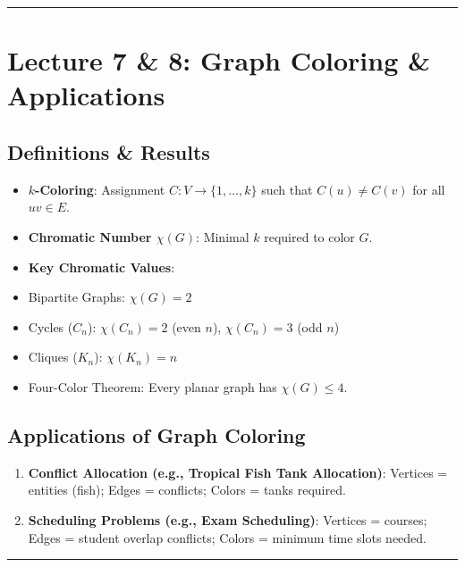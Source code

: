 \documentclass[
]{book}
\theoremstyle{definition}
\theoremstyle{definition}
\theoremstyle{definition}
\theoremstyle{definition}
\theoremstyle{remark}
\begin{document}
\begin{center}\rule{0.5\linewidth}{0.5pt}\end{center}

\section{Lecture 7 \& 8: Graph Coloring \& Applications}\label{lecture-7-8-graph-coloring-applications}

\subsection{Definitions \& Results}\label{definitions-results}

\begin{itemize}
\item
  \textbf{\(k\)-Coloring}: Assignment \(C: V \to \{1, \dots, k\}\) such that \(C(u) \ne C(v)\) for all \(uv \in E\).
\item
  \textbf{Chromatic Number \(\chi(G)\)}: Minimal \(k\) required to color \(G\).
\item
  \textbf{Key Chromatic Values}:
\item
  Bipartite Graphs: \(\chi(G) = 2\)
\item
  Cycles (\(C_n\)): \(\chi(C_n) = 2\) (even \(n\)), \(\chi(C_n) = 3\) (odd \(n\))
\item
  Cliques (\(K_n\)): \(\chi(K_n) = n\)
\item
  Four-Color Theorem: Every planar graph has \(\chi(G) \le 4\).
\end{itemize}

\subsection{Applications of Graph Coloring}\label{applications-of-graph-coloring}

\begin{enumerate}
\def\labelenumi{\arabic{enumi}.}
\item
  \textbf{Conflict Allocation (e.g., Tropical Fish Tank Allocation)}: Vertices = entities (fish); Edges = conflicts; Colors = tanks required.
\item
  \textbf{Scheduling Problems (e.g., Exam Scheduling)}: Vertices = courses; Edges = student overlap conflicts; Colors = minimum time slots needed.
\end{enumerate}

\begin{center}\rule{0.5\linewidth}{0.5pt}\end{center}
\end{document}

